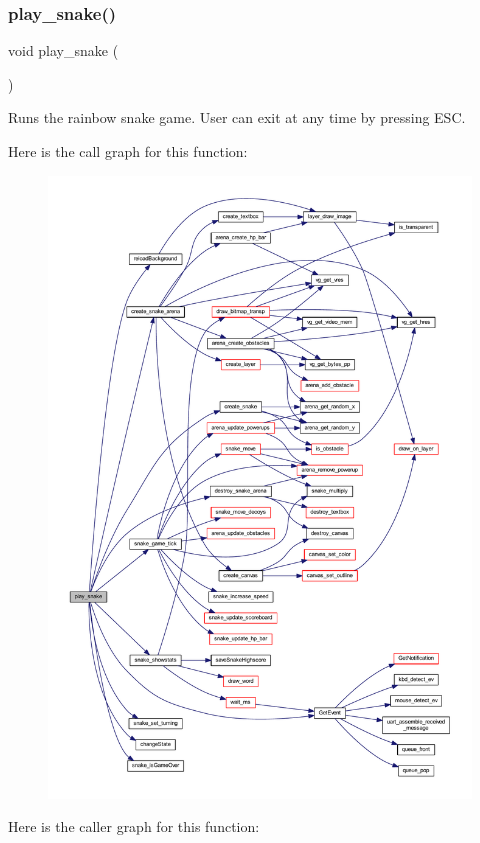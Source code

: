 \subsubsection{\texorpdfstring{play\+\_\+snake()}{play\_snake()}}
{\footnotesize\ttfamily void play\+\_\+snake (\begin{DoxyParamCaption}{ }\end{DoxyParamCaption})}



Runs the rainbow snake game. User can exit at any time by pressing E\+SC. 

Here is the call graph for this function\+:\nopagebreak
\begin{figure}[H]
\begin{center}
\leavevmode
\includegraphics[width=350pt]{group__pengoo_gab63f8a21d8bd92b9f638151a9912fa84_cgraph}
\end{center}
\end{figure}
Here is the caller graph for this function\+:\nopagebreak
